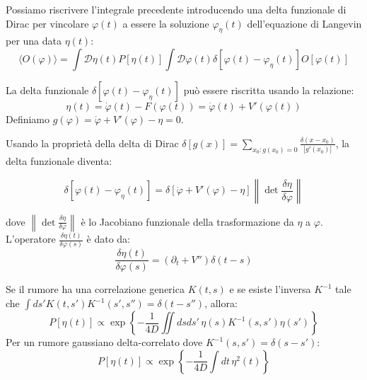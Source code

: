 Possiamo riscrivere l'integrale precedente introducendo una delta funzionale di Dirac per vincolare $\varphi(t)$ a essere la soluzione $\varphi_{\eta}(t)$ dell'equazione di Langevin per una data $\eta(t)$:
\begin{equation}
\langle O(\varphi) \rangle = \int \mathcal{D}\eta(t) P[\eta(t)] \int \mathcal{D}\varphi(t) \delta[\varphi(t) - \varphi_{\eta}(t)] O[\varphi(t)]
\label{eq:media_osservabile_delta}
\end{equation}

La delta funzionale $\delta[\varphi(t) - \varphi_{\eta}(t)]$ può essere riscritta usando la relazione:
\begin{equation}
\eta(t) = \dot{\varphi}(t) - F(\varphi(t)) = \dot{\varphi}(t) + V'(\varphi(t)) 
\end{equation}
Definiamo $g(\varphi) = \dot{\varphi} + V'(\varphi) - \eta = 0$.

Usando la proprietà della delta di Dirac $\delta[g(x)] = \sum_{x_0: g(x_0)=0} \frac{\delta(x-x_0)}{|g'(x_0)|}$, la delta funzionale diventa:
\begin{tcolorbox}[
    colback=colorA!5,      
    colframe=colorA,       
    arc=3mm,               
    boxrule=1.2pt
]
\begin{equation}
\delta[\varphi(t) - \varphi_{\eta}(t)] = \delta[\dot{\varphi} + V'(\varphi) - \eta] \left\| \det \frac{\delta \eta}{\delta \varphi} \right\|
\end{equation}
\end{tcolorbox}
dove $\left\| \det \frac{\delta \eta}{\delta \varphi} \right\|$ è lo Jacobiano funzionale della trasformazione da $\eta$ a $\varphi$. L'operatore $\frac{\delta \eta(t)}{\delta \varphi(s)}$ è dato da:
\begin{equation}
\frac{\delta \eta(t)}{\delta \varphi(s)} = \left( \partial_t + V'' \right) \delta(t-s)
\end{equation}

Se il rumore ha una correlazione generica $K(t,s)$ e se esiste l'inversa $K^{-1}$ tale che $\int ds' K(t,s')K^{-1}(s',s'') = \delta(t-s'')$, allora:
\begin{equation}
P[\eta(t)] \propto \exp\left\{ -\frac{1}{4D} \iint ds ds' \, \eta(s) K^{-1}(s,s') \eta(s') \right\}
\end{equation}
Per un rumore gaussiano delta-correlato dove $K^{-1}(s, s')=\delta(s-s')$:
\begin{equation}
P[\eta(t)] \propto \exp\left\{ -\frac{1}{4D} \int dt \, \eta^2(t) \right\}
\end{equation}

